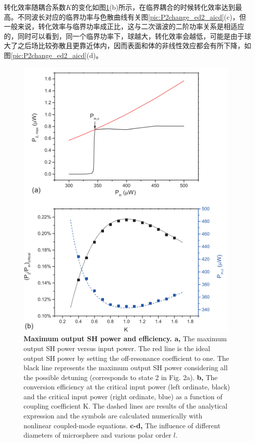\documentclass[UTF8,a4paper,cs4size,hyperref]{ctexart}
\begin{document}
转化效率随耦合系数$K$的变化如图\ref{pic:P2change_ed2_ai}(b)所示，在临界耦合的时候转化效率达到最高。不同波长对应的临界功率与色散曲线有关图\ref{pic:P2change_ed2_aicd}(c)，但一般来说，转化效率与临界功率成正比，这与二次谐波的二阶功率关系是相适应的，同时可以看到，同一个临界功率下，球越大，转化效率会越低，可能是由于球大了之后场比较弥散且更靠近体内，因而表面和体的非线性效应都会有所下降，如图\ref{pic:P2change_ed2_aicd}(d)。
\begin{figure}
\includegraphics[width=11cm]{P2change_ed2_ai}
\centering
\caption{\textbf{Maximum output SH power and efficiency. a,} The maximum output SH power versus input power. The red line is the ideal output SH power by setting the off-resonance coefficient to one. The black line represents the maximum output SH power considering all the possible detuning (corresponds to state 2 in Fig. 2a). \textbf{b, } The conversion efficiency at the critical input power (left ordinate, black) and the critical input power (right ordinate, blue) as a function of coupling coefficient K. The dashed lines are results of the analytical expression and the symbols are calculated numerically with nonlinear coupled-mode equations. \textbf{c-d, } The influence of different diameters of microsphere and various polar order $l$. }
\label{pic:P2change_ed2_ai}
\end{figure}
\end{document}
